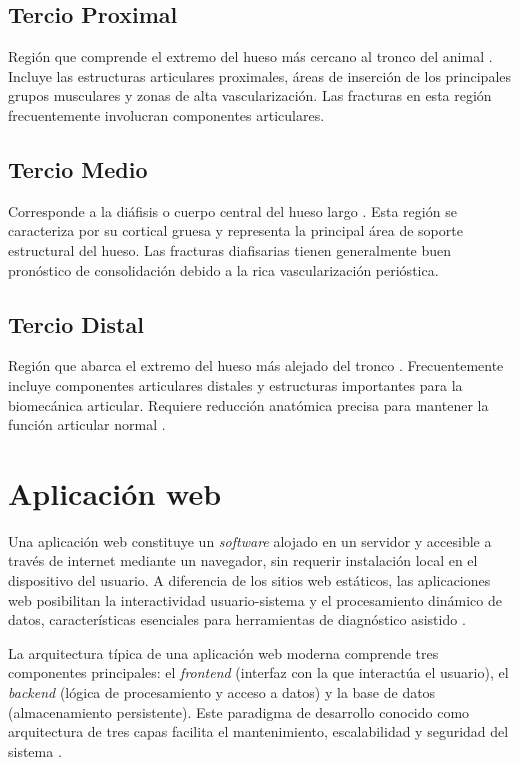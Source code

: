 {\subsection{Tercio Proximal}

Región que comprende el extremo del hueso más cercano al tronco del animal \cite{dyce2012anatomia}. Incluye las estructuras articulares proximales, áreas de inserción de los principales grupos musculares y zonas de alta vascularización. Las fracturas en esta región frecuentemente involucran componentes articulares.

\subsection{Tercio Medio}

Corresponde a la diáfisis o cuerpo central del hueso largo \cite{hermanson2019millers}. Esta región se caracteriza por su cortical gruesa y representa la principal área de soporte estructural del hueso. Las fracturas diafisarias tienen generalmente buen pronóstico de consolidación debido a la rica vascularización perióstica.

\subsection{Tercio Distal}

Región que abarca el extremo del hueso más alejado del tronco \cite{hermanson2019millers}. Frecuentemente incluye componentes articulares distales y estructuras importantes para la biomecánica articular. Requiere reducción anatómica precisa para mantener la función articular normal \cite{thrall2018textbook}.

\section{Aplicación web}
Una aplicación web constituye un \textit{software} alojado en un servidor y accesible a través de internet mediante un navegador, sin requerir instalación local en el dispositivo del usuario. A diferencia de los sitios web estáticos, las aplicaciones web posibilitan la interactividad usuario-sistema y el procesamiento dinámico de datos, características esenciales para herramientas de diagnóstico asistido \cite{shklar2021web}.

La arquitectura típica de una aplicación web moderna comprende tres componentes principales: el \textit{frontend} (interfaz con la que interactúa el usuario), el \textit{backend} (lógica de procesamiento y acceso a datos) y la base de datos (almacenamiento persistente). Este paradigma de desarrollo conocido como arquitectura de tres capas facilita el mantenimiento, escalabilidad y seguridad del sistema \cite{fowler2019patterns}.

}
